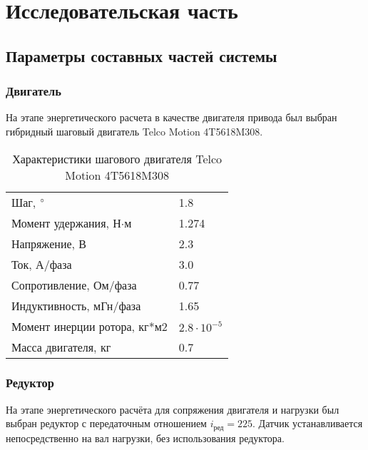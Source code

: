 \newpage
\section{Исследовательская часть}






\newpage
\subsection{Параметры составных частей системы}


\subsubsection{Двигатель}
На этапе энергетического расчета в качестве двигателя привода был выбран
гибридный шаговый двигатель Telco Motion 4T5618M308.

\begin{table}[ht]
    \centering
    \begin{tabular}{l|l}
    \hline
    Шаг, $\degree$                          & 1.8                   \\
    Момент удержания, Н$\cdot$м             & 1.274                 \\
    Напряжение, В                           & 2.3                   \\
    Ток, А/фаза                             & 3.0                   \\
    Сопротивление, Ом/фаза                  & 0.77                  \\
    Индуктивность, мГн/фаза                 & 1.65                  \\
    Момент инерции ротора, кг*м2            & $2.8 \cdot 10^{-5}$   \\
    Масса двигателя, кг                     & 0.7                   \\
    \hline
    \end{tabular}
    \caption{Характеристики шагового двигателя Telco Motion 4T5618M308}
    \label{engine_params}
\end{table}

\subsubsection{Редуктор}
На этапе энергетического расчёта для сопряжения двигателя и нагрузки
был выбран редуктор с передаточным отношением $i_\text{ред} = 225$. Датчик
устанавливается непосредственно на вал нагрузки, без использования редуктора.

